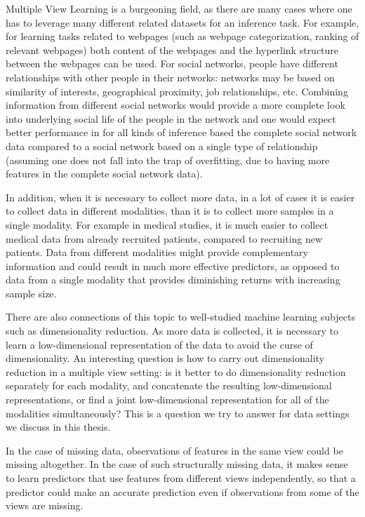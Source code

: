 \documentclass[12pt,oneside,final]{thesis}\usepackage[]{graphicx}\usepackage[]{color}
\begin{document}
 Multiple View Learning is a burgeoning field, as there are many cases where one has to leverage many different related datasets for an inference task. For example, for learning  tasks related to webpages (such as webpage categorization, ranking of relevant webpages) both content of the webpages and the hyperlink structure between the webpages can be used. For social networks, people have different relationships with other people in their networks: networks  may be based on similarity of interests, geographical proximity, job relationships, etc. Combining information from different social networks would provide a more complete look into underlying social life of the people in the network and one would expect better performance in for all kinds of  inference based the complete social network data compared to a social network based on a single type of relationship (assuming one does not fall into the trap of overfitting, due to having more features in the complete social network data).

In addition, when it is necessary to collect more data, in a lot of cases it is easier to collect data in different modalities, than it is to collect more samples in a single modality. For example in medical studies, it is much easier to  collect medical data from already recruited patients, compared to recruiting new patients. Data from different modalities might provide complementary information and could result in much more effective predictors, as opposed to data from a single modality that provides diminishing returns with increasing sample size.

There are  also connections of this topic to well-studied machine learning subjects such as dimensionality reduction. As more data is collected, it is necessary to learn a low-dimensional representation of the data to avoid the curse of dimensionality. An interesting question is how to carry out dimensionality reduction in a multiple view setting: is it better to do dimensionality reduction separately for each modality, and concatenate the resulting low-dimensional representations, or find a joint low-dimensional representation  for all of the modalities simultaneously? This is a question we try to answer for data settings we discuss in this thesis.

In the case of missing data, observations of features in the same view could  be missing altogether. In the case of such structurally missing data, it makes sense to learn predictors that use features from different views independently, so that a predictor could make an accurate prediction even if observations from some of the views are missing.
\end{document}
